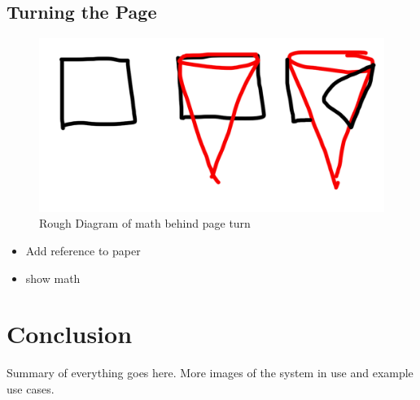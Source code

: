 \documentclass[12pt]{report}
\begin{document}
\section{Turning the Page}
\begin{figure}[h]
\includegraphics[width=0.9\linewidth]{TurningThePage}
\caption{Rough Diagram of math behind page turn}
\end{figure}
\begin{itemize}
\item Add reference to paper
\item show math
\end{itemize}


\pagebreak

\chapter{Conclusion}
Summary of everything goes here. More images of the system in use and example use cases.
\end{document}
